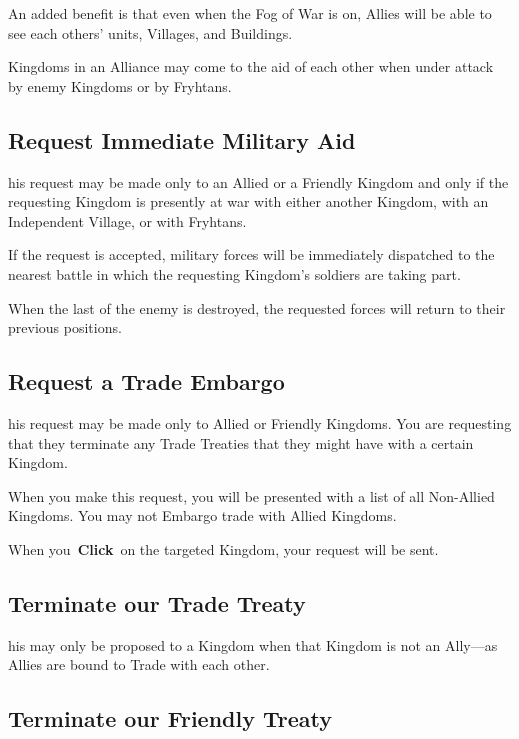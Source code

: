 An added benefit is that even when the Fog of War is on, Allies will be able to see each others’ units, Villages, and Buildings.

Kingdoms in an Alliance may come to the aid of each other when under attack by enemy Kingdoms or by Fryhtans.

\subsection{Request Immediate Military Aid}

his request may be made only to an Allied or a Friendly Kingdom and only if the requesting Kingdom is presently at war with either another Kingdom, with an Independent Village, or with Fryhtans.

If the request is accepted, military forces will be immediately dispatched to the nearest battle in which the requesting Kingdom’s soldiers are taking part.

When the last of the enemy is destroyed, the requested forces will return to their previous positions.

\subsection{Request a Trade Embargo}

his request may be made only to Allied or Friendly Kingdoms. You are requesting that they terminate any Trade Treaties that they might have with a certain Kingdom.

When you make this request, you will be presented with a list of all Non-Allied Kingdoms. You may not Embargo trade with Allied Kingdoms.

When you \textbf{Click} on the targeted Kingdom, your request will be sent.

\subsection{Terminate our Trade Treaty}

his may only be proposed to a Kingdom when that Kingdom is not an Ally---as Allies are bound to Trade with each other.

\subsection{Terminate our Friendly Treaty}


